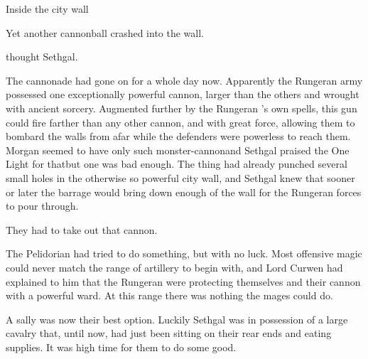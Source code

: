 

\stamp
  {\datePelidorianSally}
  {Inside the \Forclin city wall}

\begin{comment}
  \subsection{Rungeran cannonade}
\end{comment}

Yet another cannonball crashed into the wall. 

 thought Sethgal. 

The cannonade had gone on for a whole day now. 
Apparently the Rungeran army possessed one exceptionally powerful cannon, larger than the others and wrought with ancient sorcery. 
Augmented further by the Rungeran \ishrah's own spells, this gun could fire farther than any other cannon, and with great force, allowing them to bombard the walls from afar while the defenders were powerless to reach them. 
Morgan seemed to have only such monster-cannon\dash and Sethgal praised the One Light for that\dash but one was bad enough. 
The thing had already punched several small holes in the otherwise so powerful city wall, and Sethgal knew that sooner or later the barrage would bring down enough of the wall for the Rungeran forces to pour through. 

They had to take out that cannon. 

The Pelidorian \ishrah had tried to do something, but with no luck. 
Most offensive magic could never match the range of artillery to begin with, and Lord Curwen had explained to him that the Rungeran \ishrah were protecting themselves and their cannon with a powerful ward. 
At this range there was nothing the mages could do. 

A sally was now their best option. 
Luckily Sethgal was in possession of a large cavalry that, until now, had just been sitting on their rear ends and eating supplies. 
It was high time for them to do some good. 


